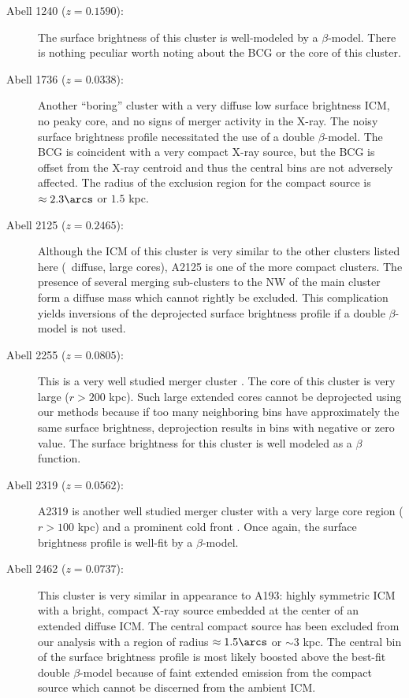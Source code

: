 \begin{description}
\item[Abell 1240 ($z=0.1590$):] The surface brightness of this cluster
  is well-modeled by a $\beta$-model. There is nothing peculiar worth
  noting about the BCG or the core of this cluster.

\item[Abell 1736 ($z=0.0338$):] Another ``boring'' cluster with a very
  diffuse low surface brightness ICM, no peaky core, and no signs of
  merger activity in the X-ray. The noisy surface brightness profile
  necessitated the use of a double $\beta$-model. The BCG is
  coincident with a very compact X-ray source, but the BCG is offset
  from the X-ray centroid and thus the central bins are not adversely
  affected. The radius of the exclusion region for the compact source
  is $\approx 2.3\arcs$ or $1.5$ kpc.

\item[Abell 2125 ($z=0.2465$):] Although the ICM of this cluster is
  very similar to the other clusters listed here (\ie\ diffuse, large
  cores), A2125 is one of the more compact clusters. The presence of
  several merging sub-clusters \citep{1997ApJ...487L..13W,
    2004ApJ...611..821W} to the NW of the main cluster form a diffuse
  mass which cannot rightly be excluded. This complication yields
  inversions of the deprojected surface brightness profile if a double
  $\beta$-model is not used.

\item[Abell 2255 ($z=0.0805$):] This is a very well studied merger
  cluster \citep{1995ApJ...446..583B, 1997A&A...317..432F}. The core
  of this cluster is very large ($r > 200$ kpc). Such large extended
  cores cannot be deprojected using our methods because if too many
  neighboring bins have approximately the same surface brightness,
  deprojection results in bins with negative or zero value. The
  surface brightness for this cluster is well modeled as a $\beta$
  function.

\item[Abell 2319 ($z=0.0562$):] A2319 is another well studied merger
  cluster \citep{1997NewA....2..501F, 1999ApJ...525L..73M} with a very
  large core region ($r > 100$ kpc) and a prominent cold front
  \citep{2004ApJ...604..604O}. Once again, the surface brightness
  profile is well-fit by a $\beta$-model.

\item[Abell 2462 ($z=0.0737$):] This cluster is very similar in
  appearance to A193: highly symmetric ICM with a bright, compact
  X-ray source embedded at the center of an extended diffuse ICM. The
  central compact source has been excluded from our analysis with a
  region of radius $\approx 1.5\arcs$ or $\sim 3$ kpc. The central
  bin of the surface brightness profile is most likely boosted above
  the best-fit double $\beta$-model because of faint extended emission
  from the compact source which cannot be discerned from the ambient
  ICM.


\end{description}
